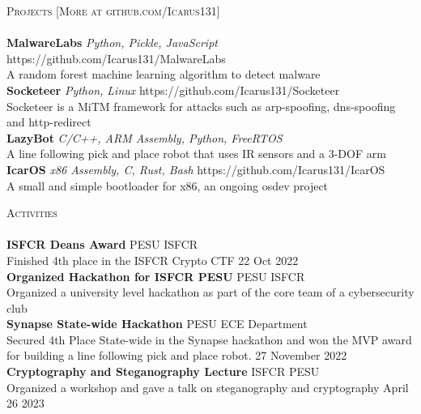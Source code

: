 \documentclass[a4paper]{article}
\newcommand{\lineunder} {
    \vspace*{-8pt} \\
    \hspace*{-18pt} \hrulefill \\
}
\newcommand{\header} [1] {
    {\hspace*{-18pt}\vspace*{6pt} \textsc{#1}}
    \vspace*{-6pt} \lineunder
}
\begin{document}
\header{Projects [More at github.com/Icarus131]}
{\textbf{MalwareLabs}} {\sl Python, Pickle, JavaScript} \hfill https://github.com/Icarus131/MalwareLabs\\
A random forest machine learning algorithm to detect malware\\
\vspace*{2mm}
{\textbf{Socketeer}} {\sl Python, Linux} \hfill https://github.com/Icarus131/Socketeer\\
Socketeer is a MiTM framework for attacks such as arp-spoofing, dns-spoofing and http-redirect\\
\vspace*{2mm}
{\textbf{LazyBot}} {\sl C/C++, ARM Assembly, Python, FreeRTOS} \\
A line following pick and place robot that uses IR sensors and a 3-DOF arm\\
\vspace*{2mm}
{\textbf{IcarOS}} {\sl x86 Assembly, C, Rust, Bash} \hfill https://github.com/Icarus131/IcarOS\\
A small and simple bootloader for x86, an ongoing osdev project\\
\vspace*{2mm}

\header{Activities}
\textbf{ISFCR Dean\textquotesingle{}s Award} \hfill PESU ISFCR\\
Finished 4th place in the ISFCR Crypto CTF \hfill 22 Oct 2022\\
\vspace*{2mm}
\textbf{Organized Hackathon for ISFCR PESU} \hfill PESU ISFCR\\
Organized a university level hackathon as part of the core team of a cybersecurity club\\
\vspace*{2mm}
\textbf{Synapse State-wide Hackathon} \hfill PESU ECE Department\\
Secured 4th Place State-wide in the Synapse hackathon and won the MVP award for building a line following pick and place robot. \hfill 27 November 2022\\
\vspace*{2mm}
\textbf{Cryptography and Steganography Lecture} \hfill ISFCR PESU\\
Organized a workshop and gave a talk on steganography and cryptography \hfill April 26 2023\\
\vspace*{2mm}

\ 
\end{document}
